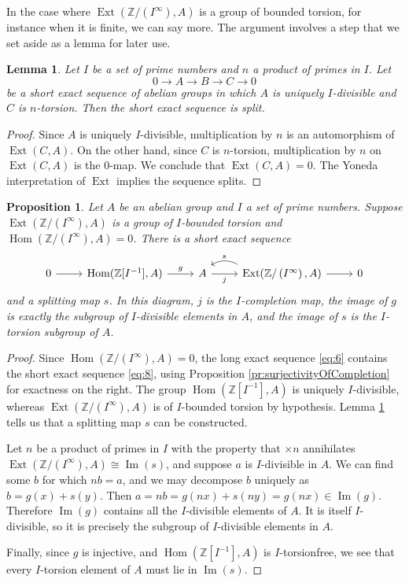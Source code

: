 \documentclass[11pt, oneside, dvipsnames, svgnames, table, final]{amsart}
\newcommand{\mathbx}[1]{\mathbb{#1}}
\theoremstyle{plain}
\newtheorem{lemma}[thm]{Lemma}
\newtheorem{proposition}[thm]{Proposition}
\theoremstyle{definition}
\theoremstyle{remark}
\newcommand{\Z}{\mathbx{Z}}
\newcommand{\Ext}{\operatorname{Ext}}
\newcommand{\Hom}{\operatorname{Hom}}
\newcommand{\isom}{\cong}
\newcommand{\iso}{\isom}
\newcommand{\im}{\operatorname{Im}}
\newcommand{\<}[1]{{\langle}#1 {\rangle}}
\newcommand{\ZIinf}{\Z/\left(I^\infty\right)}
\begin{document}
In the case where $\Ext(\ZIinf, A)$ is a group of bounded torsion, for instance when it is finite, we can say more. The argument involves a step that we set aside as a lemma for later use.

\begin{lemma} \label{lem:divTorExt}
  Let $I$ be a set of prime numbers and $n$ a product of primes in $I$. Let
  \[ 0 \to A \to B \to C \to 0 \]
  be a short exact sequence of abelian groups in which $A$ is uniquely $I$-divisible and $C$ is $n$-torsion. Then the short exact sequence is split.
\end{lemma}
\begin{proof}
 Since $A$ is uniquely $I$-divisible, multiplication by $n$ is an automorphism of $\Ext(C,A)$. On the other hand, since $C$ is $n$-torsion, multiplication by $n$ on $\Ext(C,A)$ is the $0$-map. We conclude that $\Ext(C,A) =0$. The Yoneda interpretation of $\Ext$ implies the sequence splits.
\end{proof}

\begin{proposition}\label{pr:splitSurjectivityOfCompletionNew}
  Let $A$ be an abelian group and $I$ a set of prime numbers. Suppose $\Ext(\ZIinf, A)$ is a group of $I$-bounded torsion and $\Hom(\ZIinf, A)=0$. There is a short exact sequence
    \begin{equation}
      \label{eq:8}
      \begin{tikzcd}
        0 \rar & \Hom(\Z[I^{-1}], A) \rar{g} & A \arrow[r,"j"'] & \Ext(\ZIinf, A) \arrow[l, bend right, "s"',start anchor = north west] \rar & 0 
      \end{tikzcd}
    \end{equation}
  and a splitting map $s$. In this diagram, $j$ is the $I$-completion map, the image of $g$ is exactly the subgroup of $I$-divisible elements in $A$, and the image of $s$ is the $I$-torsion subgroup of $A$.
\end{proposition}
\begin{proof}
  Since $\Hom(\ZIinf,A)=0$, the long exact sequence \eqref{eq:6} contains the short exact sequence \eqref{eq:8}, using Proposition \ref{pr:surjectivityOfCompletion} for exactness on the right. The group $\Hom(\Z[I^{-1}], A)$ is uniquely $I$-divisible, whereas $\Ext(\ZIinf,A)$ is of $I$-bounded torsion by hypothesis. Lemma \ref{lem:divTorExt} tells us that  a splitting map $s$ can be constructed.
    
  Let $n$ be a product of primes in $I$ with the property that $\times n$ annihilates $\Ext(\ZIinf, A) \iso \im(s)$, and suppose $a$ is $I$-divisible in $A$. We can find some $b$ for which $nb=a$, and we may decompose $b$ uniquely as $b=g(x) + s(y)$. Then $a=nb=g(nx) + s(ny) = g(nx) \in \im(g)$. Therefore $\im(g)$ contains all the $I$-divisible elements of $A$. It is itself $I$-divisible, so it is precisely the subgroup of $I$-divisible elements in $A$.
  
  Finally, since $g$ is injective, and $\Hom(\Z[I^{-1}], A)$ is $I$-torsionfree, we see that every $I$-torsion element of $A$ must lie in $\im(s)$.
\end{proof}
  
\end{document}
